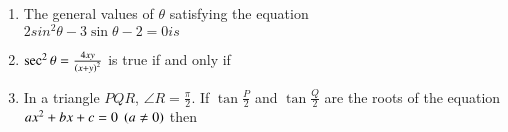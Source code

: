 \documentclass[journal,12pt,twocolumn]{IEEEtran}
\theoremstyle{remark}
\begin{document}
\begin{enumerate}
    \item The general values of $\theta$ satisfying the equation\\$2sin^2{\theta}-3\sin{\theta}-2=0 is$
        
        \begin{enumerate}[label={(\alph*)}]

        \end{enumerate}

    \item $\sec^2{\theta} = \frac{4xy}{\left(x+y\right)^2}$ is true if and only if
        
        \begin{enumerate}[label={(\alph*)}]

        \end{enumerate}
        
    \item In a triangle $PQR$, $\angle R = \frac{\pi}{2}$. If $\tan{\frac{P}{2}}$ and $\tan{\frac{Q}{2}}$ are the roots of the equation $ax^2+bx+c=0 \;\left(a\neq0\right)$ then
        

\end{enumerate}
\end{document}
